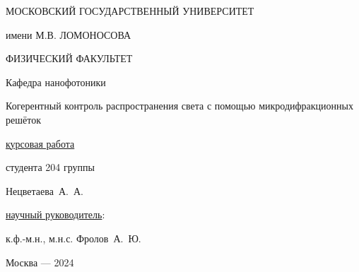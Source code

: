 \begin{titlepage}
    {\Large \center
        МОСКОВСКИЙ ГОСУДАРСТВЕННЫЙ УНИВЕРСИТЕТ

        имени М.В. ЛОМОНОСОВА

        ФИЗИЧЕСКИЙ ФАКУЛЬТЕТ

        Кафедра нанофотоники

    }
    \begin{centering}
        \vspace{4cm}
        \Large
        \centering
        Когерентный контроль распространения света с помощью микродифракционных решёток\\
    \end{centering}
    \vspace{4cm}
    \begin{flushright}
        \underline{курсовая работа}

        студента 204 группы

        Нецветаева~А.~А. \vspace{1.5cm}

        \underline{научный руководитель}:

        к.ф.-м.н., м.н.с. Фролов~А.~Ю.

    \end{flushright}
    \vspace{4cm}
    \begin{centering}
        Москва --- 2024

    \end{centering}
\end{titlepage}

